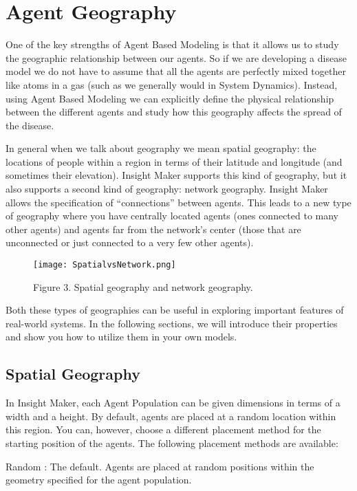 \documentclass[]{memoir}
\makeatletter
\def\maxwidth{\ifdim\Gin@nat@width>\linewidth\linewidth
\else\Gin@nat@width\fi}
\let\Oldincludegraphics\includegraphics
\renewcommand{\includegraphics}[1]{\Oldincludegraphics[width=\maxwidth]{#1}}
\makeatother
\begin{document}
\section{Agent Geography}

One of the key strengths of Agent Based Modeling is that it allows us to
study the geographic relationship between our agents. So if we are
developing a disease model we do not have to assume that all the agents
are perfectly mixed together like atoms in a gas (such as we generally
would in System Dynamics). Instead, using Agent Based Modeling we can
explicitly define the physical relationship between the different agents
and study how this geography affects the spread of the disease.

In general when we talk about geography we mean spatial geography: the
locations of people within a region in terms of their latitude and
longitude (and sometimes their elevation). Insight Maker supports this
kind of geography, but it also supports a second kind of geography:
network geography. Insight Maker allows the specification of
``connections'' between agents. This leads to a new type of geography
where you have centrally located agents (ones connected to many other
agents) and agents far from the network's center (those that are
unconnected or just connected to a very few other agents).

\begin{figure}[htbp]
\centering
\texttt{[image: SpatialvsNetwork.png]}
\caption{Figure 3. Spatial geography and network geography.}
\end{figure}

Both these types of geographies can be useful in exploring important
features of real-world systems. In the following sections, we will
introduce their properties and show you how to utilize them in your own
models.

\subsection{Spatial Geography}

In Insight Maker, each Agent Population can be given dimensions in terms
of a width and a height. By default, agents are placed at a random
location within this region. You can, however, choose a different
placement method for the starting position of the agents. The following
placement methods are available:

Random : The default. Agents are placed at random positions within the
geometry specified for the agent population.
\end{document}

